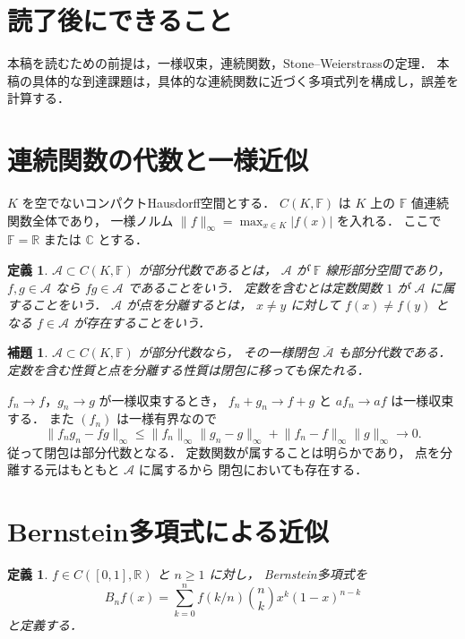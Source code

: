 \documentclass[a5paper,10pt,onecolumn]{jsarticle}
\makeatletter
\theoremstyle{mathnotetheorem}
\newtheorem{definition}[theorem]{定義}
\newtheorem{lemma}[theorem]{補題}
\renewcommand{\proofname}{証明}
\renewenvironment{proof}[1][\proofname]{%
  \par\pushQED{\qed}\normalfont\topsep4\p@\@plus2\p@\relax
  \trivlist\item[\hskip\labelsep\bfseries #1]\ignorespaces
}{\popQED\endtrivlist\@endpefalse}
\newcommand{\norm}[1]{\lVert #1\rVert}
\makeatother
\begin{document}
\section*{読了後にできること}
本稿を読むための前提は，一様収束，連続関数，Stone--Weierstrassの定理．
本稿の具体的な到達課題は，具体的な連続関数に近づく多項式列を構成し，誤差を計算する．

\section{連続関数の代数と一様近似}

$K$ を空でないコンパクトHausdorff空間とする．
$C(K,\mathbb F)$ は $K$ 上の $\mathbb F$ 値連続関数全体であり，
一様ノルム $\norm f_\infty=\max_{x\in K}|f(x)|$ を入れる．
ここで $\mathbb F=\mathbb R$ または $\mathbb C$ とする．

\begin{definition}
$\mathcal A\subset C(K,\mathbb F)$ が\emph{部分代数}であるとは，
$\mathcal A$ が $\mathbb F$ 線形部分空間であり，
$f,g\in\mathcal A$ なら $fg\in\mathcal A$ であることをいう．
\emph{定数を含む}とは定数関数 $1$ が $\mathcal A$ に属することをいう．
$\mathcal A$ が\emph{点を分離する}とは，
$x\ne y$ に対して $f(x)\ne f(y)$ となる
$f\in\mathcal A$ が存在することをいう．
\end{definition}

\begin{lemma}\label{lem:closed-algebra}
$\mathcal A\subset C(K,\mathbb F)$ が部分代数なら，
その一様閉包 $\overline{\mathcal A}$ も部分代数である．
定数を含む性質と点を分離する性質は閉包に移っても保たれる．
\end{lemma}
\begin{proof}
$f_n\to f$，$g_n\to g$ が一様収束するとき，
$f_n+g_n\to f+g$ と $af_n\to af$ は一様収束する．
また $(f_n)$ は一様有界なので
\[
 \norm{f_ng_n-fg}_\infty
 \le\norm{f_n}_\infty\norm{g_n-g}_\infty
     +\norm{f_n-f}_\infty\norm g_\infty\to0.
\]
従って閉包は部分代数となる．
定数関数が属することは明らかであり，
点を分離する元はもともと $\mathcal A$ に属するから
閉包においても存在する．
\end{proof}

\section{Bernstein多項式による近似}

\begin{definition}
$f\in C([0,1],\mathbb R)$ と $n\ge1$ に対し，
Bernstein多項式を
\[
 B_nf(x)=\sum_{k=0}^nf(k/n){n\choose k}x^k(1-x)^{n-k}
\]
と定義する．
\end{definition}
\end{document}
